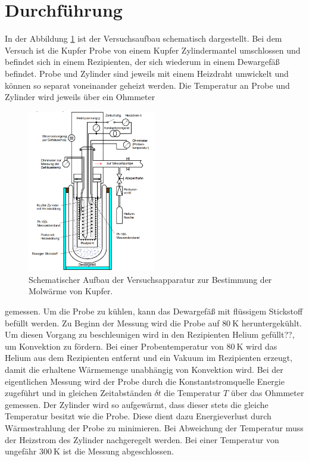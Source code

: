 \newpage
\section{Durchführung}
\label{sec:Durchführung}
In der Abbildung \ref{fig:aufbau} ist der Versuchsaufbau schematisch
dargestellt.
Bei dem Versuch ist die Kupfer Probe von einem Kupfer Zylindermantel
umschlossen und
befindet sich
in einem Rezipienten, der sich wiederum in einem
Dewargefäß befindet. Probe und Zylinder
sind jeweils mit einem Heizdraht umwickelt und können so
separat voneinander geheizt werden.
Die Temperatur an Probe und Zylinder wird jeweils über ein Ohmmeter
\begin{figure}
  \centering
  \includegraphics[width=0.5\textwidth]{Aufbau.PNG}
  \caption{Schematischer Aufbau der Versuchsapparatur zur Bestimmung der Molwärme von Kupfer. \cite{sample}}
  \label{fig:aufbau}
\end{figure}
gemessen.
Um die Probe
zu kühlen, kann das Dewargefäß mit flüssigem Stickstoff
befüllt werden.
Zu Beginn der Messung wird die Probe auf $\SI{80}{\kelvin}$
heruntergekühlt.
Um diesen Vorgang zu beschleunigen wird in den Rezipienten Helium
gefüllt??, um Konvektion zu fördern. Bei einer Probentemperatur von $\SI{80}{\kelvin}$ wird das Helium aus dem
Rezipienten entfernt und ein
Vakuum im Rezipienten
erzeugt, damit die erhaltene Wärmemenge unabhängig von Konvektion wird.
Bei der eigentlichen Messung wird der Probe durch die Konstantstromquelle
Energie zugeführt und
in gleichen Zeitabständen $\delta t$
die Temperatur $T$ über das Ohmmeter gemessen.
Der Zylinder wird so aufgewärmt, dass
dieser stets die gleiche Temperatur
besitzt wie die Probe.
Diese dient dazu Energieverlust
durch Wärmestrahlung der Probe zu minimieren.
Bei Abweichung der Temperatur muss der Heizstrom des Zylinder
nachgeregelt werden. Bei einer Temperatur von ungefähr $\SI{300}{\kelvin}$
ist die Messung abgeschlossen.

